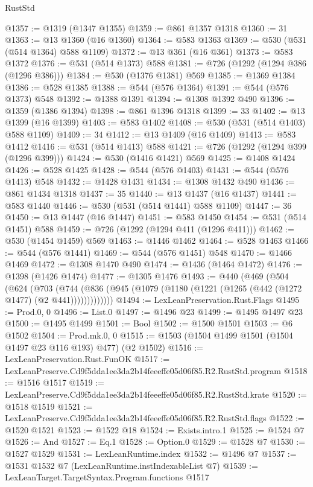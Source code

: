 \begin{lexlean}{RustStd}
\begin{coremodule}
@1357 := @1319 (@1347 @1355)
@1359 := @861 @1357 @1318
@1360 := 31
@1363 := @13 @1360 (@16 @1360)
@1364 := @583 @1363
@1369 := @530 (@531 (@514 @1364) @588 @1109)
@1372 := @13 @361 (@16 @361)
@1373 := @583 @1372
@1376 := @531 (@514 @1373) @588
@1381 := @726 (@1292 (@1294 @386 (@1296 @386)))
@1384 := @530 (@1376 @1381) @569
@1385 := @1369 @1384
@1386 := @528 @1385
@1388 := @544 (@576 @1364)
@1391 := @544 (@576 @1373) @548
@1392 := @1388 @1391
@1394 := @1308 @1392 @490
@1396 := @1359 (@1386 @1394)
@1398 := @861 @1396 @1318
@1399 := 33
@1402 := @13 @1399 (@16 @1399)
@1403 := @583 @1402
@1408 := @530 (@531 (@514 @1403) @588 @1109)
@1409 := 34
@1412 := @13 @1409 (@16 @1409)
@1413 := @583 @1412
@1416 := @531 (@514 @1413) @588
@1421 := @726 (@1292 (@1294 @399 (@1296 @399)))
@1424 := @530 (@1416 @1421) @569
@1425 := @1408 @1424
@1426 := @528 @1425
@1428 := @544 (@576 @1403)
@1431 := @544 (@576 @1413) @548
@1432 := @1428 @1431
@1434 := @1308 @1432 @490
@1436 := @861 @1434 @1318
@1437 := 35
@1440 := @13 @1437 (@16 @1437)
@1441 := @583 @1440
@1446 := @530 (@531 (@514 @1441) @588 @1109)
@1447 := 36
@1450 := @13 @1447 (@16 @1447)
@1451 := @583 @1450
@1454 := @531 (@514 @1451) @588
@1459 := @726 (@1292 (@1294 @411 (@1296 @411)))
@1462 := @530 (@1454 @1459) @569
@1463 := @1446 @1462
@1464 := @528 @1463
@1466 := @544 (@576 @1441)
@1469 := @544 (@576 @1451) @548
@1470 := @1466 @1469
@1472 := @1308 @1470 @490
@1474 := @1436 (@1464 @1472)
@1476 := @1398 (@1426 @1474)
@1477 := @1305 @1476
@1493 := @440
    (@469
      (@504
        (@624
          (@703
            (@744 (@836 (@945 (@1079 (@1180 (@1221 (@1265 (@442 (@1272 @1477) (@2 @441)))))))))))))
@1494 := LexLeanPreservation.Rust.Flags
@1495 := Prod.{0, 0}
@1496 := List.{0}
@1497 := @1496 @23
@1499 := @1495 @1497 @23
@1500 := @1495 @1499
@1501 := Bool
@1502 := @1500 @1501
@1503 := @6 @1502
@1504 := Prod.mk.{0, 0}
@1515 := @1503 (@1504 @1499 @1501 (@1504 @1497 @23 @116 @193) @477) (@2 @1502)
@1516 := LexLeanPreservation.Rust.FunOK
@1517 := LexLeanPreserve.Cd9f5dda1ee3da2b14feeeffe05d06f85.R2.RustStd.program
@1518 := @1516 @1517
@1519 := LexLeanPreserve.Cd9f5dda1ee3da2b14feeeffe05d06f85.R2.RustStd.krate
@1520 := @1518 @1519
@1521 := LexLeanPreserve.Cd9f5dda1ee3da2b14feeeffe05d06f85.R2.RustStd.flags
@1522 := @1520 @1521
@1523 := @1522 @18
@1524 := Exists.intro.{1}
@1525 := @1524 @7
@1526 := And
@1527 := Eq.{1}
@1528 := Option.{0}
@1529 := @1528 @7
@1530 := @1527 @1529
@1531 := LexLeanRuntime.index
@1532 := @1496 @7
@1537 := @1531 @1532 @7 (LexLeanRuntime.instIndexableList @7)
@1539 := LexLeanTarget.TargetSyntax.Program.functions @1517

\end{coremodule}
\end{lexlean}
